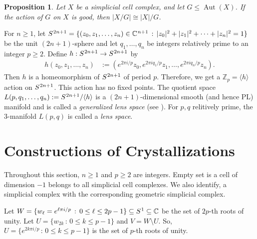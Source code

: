 \documentclass[12pt]{article}
\theoremstyle{theorem}
\newtheorem{proposition}[theorem]{Proposition}
\theoremstyle{definition}
\begin{document}
\begin{proposition} \label{prop:good}
 Let $X$ be a simplicial cell complex, and let $G \leq \operatorname{Aut}(X)$. 
 If the action of $G$ on $X$ is good, then $\left | X/G \right | \cong |X|/G$. 
\end{proposition}

For $n\geq 1$, let $S^{\hspace{.2mm}2n+1} = \{(z_0, z_1, \dots, z_n)\in \mathbb{C}^{\hspace{.2mm}n+1} \, : \, |z_0|^2 + |z_1|^2+ \cdots + |z_n|^2 =1\}$ be the unit $(2n+1)$-sphere and let $q_1, \dots, q_n$ be integers relatively prime to an integer $p\geq 2$. Define $h: S^{\hspace{.2mm}2n+1}  \to S^{\hspace{.2mm}2n+1} $ by 
\begin{align}\label{eq:action}
h(z_0, z_1, \dots, z_n) & := (e^{2\pi i/p}z_0, e^{2\pi iq_1/p}z_1, \dots, e^{2\pi iq_n/p}z_n). 
\end{align}
Then $h$ is a homeomorphism of $S^{\hspace{.2mm}2n+1}$ of period $p$. Therefore, we get  a $\mathbb{Z}_p=\langle h\rangle$ action on $S^{\hspace{.2mm}2n+1}$. This action has no fixed points. The quotient space $L(p, q_1, \dots, q_n) := S^{\hspace{.2mm}2n+1}/ \langle h\rangle$ is a $(2n+1)$-dimensional smooth (and hence PL) manifold and is called a {\em generalized lens space}  (see \cite{Sp90}). For $p, q$ relitively prime, the 3-manifold $L(p,q)$ is called a {\em lens space}. 


\section{Constructions of Crystallizations}\label{sec:construction}

Throughout this section, $n\geq 1$ and $p\geq 2$ are integers. Empty set is a cell of dimension $-1$ belongs to all simplicial cell complexes. We also identify, a simplicial complex with the corresponding geometric simplicial complex. 

Let $W =\{ w_{\ell} = e^{\ell\pi i/p} \, : \, 0\leq \ell\leq 2p-1\} \subseteq S^{\hspace{.2mm}1}\subseteq \mathbb{C}$ be the set of $2p$-th roots of unity. Let $U= \{w_{2k} \, :\, 0\leq k\leq p-1\}$ and $V= W\setminus U$. So, $U = \{e^{2k\pi i/p} \, : \, 0\leq k\leq p-1\}$ is the set of $p$-th roots of unity.  
\end{document}
